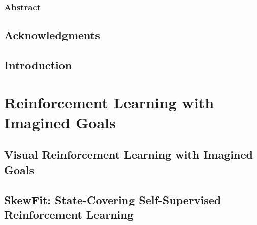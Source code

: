 \documentclass[ titlepage,numbers=noenddot,headinclude,
                footinclude=true,cleardoublepage=empty,abstractoff,
                BCOR=5mm,paper=letter,fontsize=12pt,
                american,
                openany
                ]{scrreprt}
\newcommand\blankpage{%
    \null
    \thispagestyle{empty}%
    \addtocounter{page}{-1}%
    \newpage}
\begin{document}
\frenchspacing
\raggedbottom
{}




\afterpage{\blankpage}

\setcounter{page}{1}
\section*{Abstract}

\newpage

\setcounter{page}{1}%

\begingroup
\let\clearpage\relax
\let\cleardoublepage\relax
\let\cleardoublepage\relax
\chapter*{Acknowledgments}

\endgroup


\pagestyle{firstpage}



\setcounter{page}{1}

\chapter{Introduction}\label{chapter:intro}



 \part{Reinforcement Learning with Imagined Goals}

 \chapter{Visual Reinforcement Learning with Imagined Goals}\label{chapter:rig}


\chapter{SkewFit: State-Covering Self-Supervised Reinforcement Learning}\label{chapter:skewfit}
\end{document}
